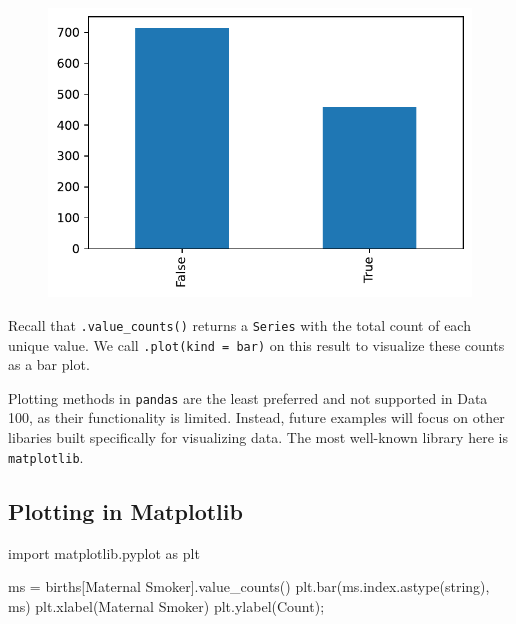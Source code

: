 \documentclass[
  letterpaper,
  DIV=11,
  numbers=noendperiod]{scrreprt}
\newenvironment{Shaded}{\begin{snugshade}}{\end{snugshade}}
\newcommand{\ImportTok}[1]{\textcolor[rgb]{0.00,0.46,0.62}{#1}}
\newcommand{\NormalTok}[1]{\textcolor[rgb]{0.00,0.23,0.31}{#1}}
\newcommand{\OperatorTok}[1]{\textcolor[rgb]{0.37,0.37,0.37}{#1}}
\newcommand{\StringTok}[1]{\textcolor[rgb]{0.13,0.47,0.30}{#1}}
\begin{document}
\begin{figure}[H]

{\centering \includegraphics{visualization_1/visualization_1_files/figure-pdf/cell-3-output-1.pdf}

}

\end{figure}

Recall that \texttt{.value\_counts()} returns a \texttt{Series} with the
total count of each unique value. We call
\texttt{.plot(kind\ =\ \textquotesingle{}bar\textquotesingle{})} on this
result to visualize these counts as a bar plot.

Plotting methods in \texttt{pandas} are the least preferred and not
supported in Data 100, as their functionality is limited. Instead,
future examples will focus on other libaries built specifically for
visualizing data. The most well-known library here is
\texttt{matplotlib}.

\hypertarget{plotting-in-matplotlib}{%
\subsection{Plotting in Matplotlib}\label{plotting-in-matplotlib}}

\begin{Shaded}
\begin{Highlighting}[]
\ImportTok{import}\NormalTok{ matplotlib.pyplot }\ImportTok{as}\NormalTok{ plt}

\NormalTok{ms }\OperatorTok{=}\NormalTok{ births[}\StringTok{\textquotesingle{}Maternal Smoker\textquotesingle{}}\NormalTok{].value\_counts()}
\NormalTok{plt.bar(ms.index.astype(}\StringTok{\textquotesingle{}string\textquotesingle{}}\NormalTok{), ms)}
\NormalTok{plt.xlabel(}\StringTok{\textquotesingle{}Maternal Smoker\textquotesingle{}}\NormalTok{)}
\NormalTok{plt.ylabel(}\StringTok{\textquotesingle{}Count\textquotesingle{}}\NormalTok{)}\OperatorTok{;}
\end{Highlighting}
\end{Shaded}
\end{document}
